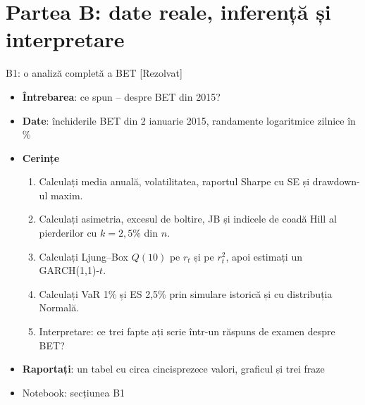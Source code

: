 \section{Partea B: date reale, inferență și interpretare}

\begin{frame}{B1: o analiză completă a BET [Rezolvat]}
\itemsize{\footnotesize}
\begin{itemize}
\item \textbf{Întrebarea}: ce spun -- despre BET din 2015?
\item \textbf{Date}: închiderile BET din 2 ianuarie 2015, randamente logaritmice zilnice în \%
\item \textbf{Cerințe}
\begin{enumerate}
    \item Calculați media anuală, volatilitatea, raportul Sharpe cu SE și drawdown-ul maxim.
    \item Calculați asimetria, excesul de boltire, JB și indicele de coadă Hill al pierderilor cu $k = 2{,}5\%$ din $n$.
    \item Calculați Ljung--Box $Q(10)$ pe $r_t$ și pe $r_t^2$, apoi estimați un GARCH(1,1)-$t$.
    \item Calculați VaR 1\% și ES 2,5\% prin simulare istorică și cu distribuția Normală.
    \item Interpretare: ce trei fapte ați scrie într-un răspuns de examen despre BET?
\end{enumerate}
\item \textbf{Raportați}: un tabel cu circa cincisprezece valori, graficul și trei fraze
\item Notebook: secțiunea B1
\end{itemize}
\end{frame}

